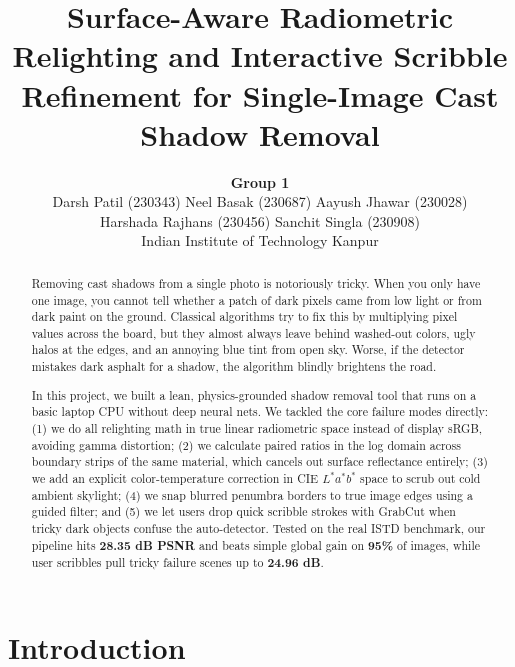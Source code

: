 \documentclass[10pt,twocolumn,letterpaper]{article}
\begin{document}
\title{Surface-Aware Radiometric Relighting and Interactive Scribble Refinement for Single-Image Cast Shadow Removal}

\author{
\textbf{Group 1}\\[0.4em]
Darsh Patil (230343) \quad Neel Basak (230687) \quad Aayush Jhawar (230028) \\
Harshada Rajhans (230456) \quad Sanchit Singla (230908) \\[0.5em]
Indian Institute of Technology Kanpur\\
}

\maketitle

\begin{abstract}
Removing cast shadows from a single photo is notoriously tricky. When you only have one image, you cannot tell whether a patch of dark pixels came from low light or from dark paint on the ground. Classical algorithms try to fix this by multiplying pixel values across the board, but they almost always leave behind washed-out colors, ugly halos at the edges, and an annoying blue tint from open sky. Worse, if the detector mistakes dark asphalt for a shadow, the algorithm blindly brightens the road. 

In this project, we built a lean, physics-grounded shadow removal tool that runs on a basic laptop CPU without deep neural nets. We tackled the core failure modes directly: (1) we do all relighting math in true linear radiometric space instead of display sRGB, avoiding gamma distortion; (2) we calculate paired ratios in the log domain across boundary strips of the same material, which cancels out surface reflectance entirely; (3) we add an explicit color-temperature correction in CIE $L^*a^*b^*$ space to scrub out cold ambient skylight; (4) we snap blurred penumbra borders to true image edges using a guided filter; and (5) we let users drop quick scribble strokes with GrabCut when tricky dark objects confuse the auto-detector. Tested on the real ISTD benchmark, our pipeline hits \textbf{28.35 dB PSNR} and beats simple global gain on \textbf{95\%} of images, while user scribbles pull tricky failure scenes up to \textbf{24.96 dB}.
\end{abstract}

\section{Introduction}
\label{sec:intro}
\end{document}
